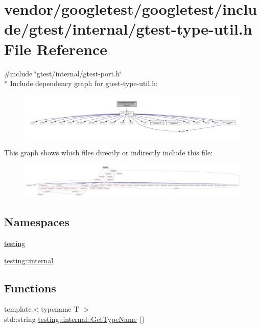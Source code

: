 \hypertarget{gtest-type-util_8h}{}\section{vendor/googletest/googletest/include/gtest/internal/gtest-\/type-\/util.h File Reference}
\label{gtest-type-util_8h}
{\ttfamily \#include \char`\"{}gtest/internal/gtest-\/port.\+h\char`\"{}}\\*
Include dependency graph for gtest-\/type-\/util.h\+:
\nopagebreak
\begin{figure}[H]
\begin{center}
\leavevmode
\includegraphics[width=350pt]{gtest-type-util_8h__incl}
\end{center}
\end{figure}
This graph shows which files directly or indirectly include this file\+:
\nopagebreak
\begin{figure}[H]
\begin{center}
\leavevmode
\includegraphics[width=350pt]{gtest-type-util_8h__dep__incl}
\end{center}
\end{figure}
\subsection*{Namespaces}
\begin{DoxyCompactItemize}
\item 
 \hyperlink{namespacetesting}{testing}
\item 
 \hyperlink{namespacetesting_1_1internal}{testing\+::internal}
\end{DoxyCompactItemize}
\subsection*{Functions}
\begin{DoxyCompactItemize}
\item 
{\footnotesize template$<$typename T $>$ }\\std\+::string \hyperlink{namespacetesting_1_1internal_a635606b4731f843c86ec8ca51cab83a1}{testing\+::internal\+::\+Get\+Type\+Name} ()
\end{DoxyCompactItemize}
